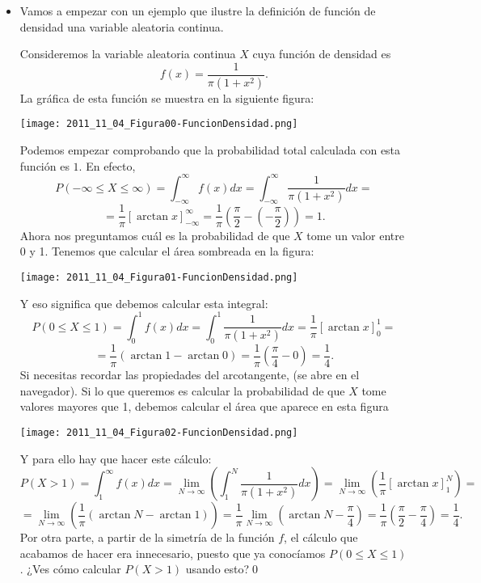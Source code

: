 \begin{itemize}
    \item Vamos a empezar con un ejemplo que ilustre la definición de función de densidad una variable aleatoria continua.
        \begin{ejemplo}
        Consideremos la variable aleatoria continua $X$ cuya función de densidad es
        \[f(x)=\dfrac{1}{\pi(1+x^2)}.\]
        La gráfica de esta función se muestra en la siguiente figura:
       \begin{center}
       \texttt{[image: 2011\_11\_04\_Figura00-FuncionDensidad.png]}
       \end{center}
        Podemos empezar comprobando que la probabilidad total calculada con esta función es $1$. En efecto,
        \[P(-\infty\leq X\leq\infty)=\int_{-\infty}^{\infty}f(x)dx=
        \int_{-\infty}^{\infty}\dfrac{1}{\pi(1+x^2)}dx=\]
        \[=\dfrac{1}{\pi}\left[\arctan x\right]_{-\infty}^{\infty}=
        \dfrac{1}{\pi}\left(\dfrac{\pi}{2}-\left(-\dfrac{\pi}{2}\right)\right)=1.
        \]
        Ahora nos preguntamos cuál es la probabilidad de que $X$ tome un valor entre 0 y 1. Tenemos que calcular el área sombreada en la figura:
       \begin{center}
       \texttt{[image: 2011\_11\_04\_Figura01-FuncionDensidad.png]}
       \end{center}
        Y eso significa que debemos calcular esta integral:
        \[
        P(0\leq X\leq 1)=\int_0^1f(x)dx=\int_0^1\dfrac{1}{\pi(1+x^2)}dx=\dfrac{1}{\pi}\left[\arctan x\right]_0^1=
        \]\[
        =\dfrac{1}{\pi}\left(\arctan 1-\arctan 0\right)=\dfrac{1}{\pi}\left(\frac{\pi}{4}-0\right)=\dfrac{1}{4}.
        \]
        Si necesitas recordar las propiedades del arcotangente,  (se abre en el navegador). Si lo que queremos es calcular la probabilidad de que $X$ tome valores mayores que 1, debemos calcular el área que aparece en esta figura
       \begin{center}
       \texttt{[image: 2011\_11\_04\_Figura02-FuncionDensidad.png]}
       \end{center}
        Y para ello hay que hacer este cálculo:
        \[
        P(X>1)=\int_1^{\infty}f(x)dx=\lim_{N\to\infty}\left(\int_1^N\dfrac{1}{\pi(1+x^2)}dx\right)=\lim_{N\to\infty}\left(\dfrac{1}{\pi}\left[\arctan x\right]_1^N\right)=
        \]\[
        =\lim_{N\to\infty}\left(\dfrac{1}{\pi}\left(\arctan N-\arctan 1\right)\right)=\dfrac{1}{\pi}\lim_{N\to\infty}\left(\arctan N-\dfrac{\pi}{4}\right)=\dfrac{1}{\pi}\left(\dfrac{\pi}{2}-\dfrac{\pi}{4}\right)=\dfrac{1}{4}.
        \]
        Por otra parte, a partir de la simetría de la función $f$, el cálculo que acabamos de hacer era innecesario, puesto que ya conocíamos $P(0\leq X\leq 1)$. ¿Ves cómo calcular $P(X>1)$ usando esto?\qed
        \end{ejemplo}



\end{itemize}
